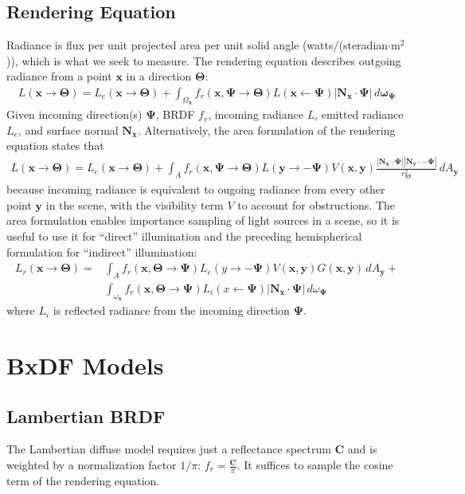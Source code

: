 \documentclass{article}
\begin{document}
  \subsection{Rendering Equation}
    Radiance is flux per unit projected area per unit solid angle 
    (watts/(steradian$\cdot$m$^2$)),
    which is what we seek to measure.
    The rendering equation describes 
    outgoing radiance from a point $\bm{x}$ 
    in a direction $\bm{\Theta}$: 
    \begin{align*}
      L(\bm{x}\to \bm{\Theta}) = L_e(\bm{x}\to\bm{\Theta}) + 
      \int_{\Omega_{\bm{x}}}f_r(\bm{x},\bm{\Psi}\to\bm{\Theta})
      L(\bm{x}\gets \bm{\Psi})|\bm{N_x}\cdot \bm{\Psi}|\,d\bm{\omega_\bm{\Psi}}
    \end{align*}
    Given incoming direction(s) $\bm{\Psi}$, BRDF $f_r$, 
    incoming radiance $L$, emitted radiance $L_e$, 
    and surface normal $\bm{N_x}$.
    Alternatively, the 
    area formulation of the rendering equation 
    states that 
    \begin{align*}
      L(\bm{x}\to \bm{\Theta}) = L_e(\bm{x}\to\bm{\Theta}) + 
      \int_{A}f_r(\bm{x},\bm{\Psi}\to\bm{\Theta})L(\bm{y}\to -\bm{\Psi})
      V(\bm{x},\bm{y})\frac{|\bm{N_x}\cdot\bm{\Psi}||\bm{N_y}\cdot -\bm{\Psi}|}{r_{\bm{xy}}^2}\,dA_{\bm{y}}
    \end{align*}
    because incoming radiance is 
    equivalent to ougoing radiance from 
    every other point $\bm{y}$ in the scene,
    with the visibility term $V$ to account for 
    obstructions.
    The area formulation enables importance sampling of 
    light sources in a scene,
    so it is useful to use it for ``direct'' illumination 
    and the preceding hemispherical formulation for ``indirect'' 
    illumination:
    \begin{align*}
      L_r(\bm{x}\to\bm{\Theta}) = 
      &\int_{A}f_r(\bm{x}, \bm{\Theta}\to\bm{\Psi})L_e(y\to-\bm{\Psi})
      V(\bm{x},\bm{y})G(\bm{x},\bm{y})\,dA_{\bm{y}}
      +\\
      &\int_{\omega_{\bm{x}}}f_r(\bm{x}, \bm{\Theta}\to\bm{\Psi})
      L_i(x\gets \bm{\Psi})|\bm{N_x}\cdot\bm{\Psi}|\,d\omega_{\bm{\Psi}}
    \end{align*}
    where $L_i$ is reflected radiance from the incoming direction $\bm{\Psi}$.
  \section{BxDF Models}
  \subsection{Lambertian BRDF}
  The Lambertian diffuse model requires 
  just a reflectance spectrum $\bm{C}$ and 
  is weighted by a normalization factor $1/\pi$:
  $f_r = \frac{\bm{C}}{\pi}$.
  It suffices to sample the cosine term of the rendering equation.
\end{document}
